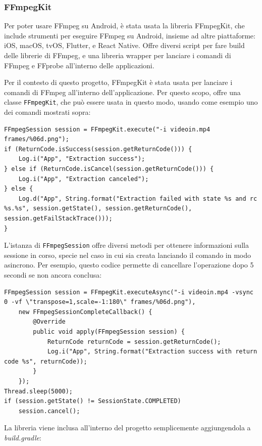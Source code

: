 \subsubsection*{FFmpegKit}

Per poter usare FFmpeg su Android, è stata usata la libreria FFmpegKit\cite{git_ffmpegkit}, che include strumenti
per eseguire FFmpeg su Android, insieme ad altre piattaforme: iOS, macOS, tvOS, Flutter, e 
React Native. Offre diversi script per fare build delle librerie di FFmpeg, e una libreria 
wrapper per lanciare i comandi di FFmpeg e FFprobe all'interno delle applicazioni. 

Per il contesto di questo progetto, FFmpegKit è stata usata per lanciare i comandi di FFmpeg
all'interno dell'applicazione. Per questo scopo, offre una classe \texttt{FFmpegKit}, che può
essere usata in questo modo, usando come esempio uno dei comandi mostrati sopra:

\begin{lstlisting}
FFmpegSession session = FFmpegKit.execute("-i videoin.mp4 frames/%06d.png");
if (ReturnCode.isSuccess(session.getReturnCode())) {
    Log.i("App", "Extraction success");
} else if (ReturnCode.isCancel(session.getReturnCode())) {
    Log.i("App", "Extraction canceled");
} else {
    Log.d("App", String.format("Extraction failed with state %s and rc %s.%s", session.getState(), session.getReturnCode(), session.getFailStackTrace()));
}
\end{lstlisting}

L'istanza di \texttt{FFmpegSession} offre diversi metodi per ottenere informazioni sulla sessione
in corso, specie nel caso in cui sia creata lanciando il comando in modo asincrono. Per esempio,
questo codice permette di cancellare l'operazione dopo 5 secondi se non ancora conclusa:

\begin{lstlisting}
FFmpegSession session = FFmpegKit.executeAsync("-i videoin.mp4 -vsync 0 -vf \"transpose=1,scale=-1:180\" frames/%06d.png"),
    new FFmpegSessionCompleteCallback() {
        @Override
        public void apply(FFmpegSession session) {
            ReturnCode returnCode = session.getReturnCode();
            Log.i("App", String.format("Extraction success with return code %s", returnCode));
        }
    });
Thread.sleep(5000);
if (session.getState() != SessionState.COMPLETED)
    session.cancel();
\end{lstlisting}

La libreria viene inclusa all'interno del progetto semplicemente aggiungendola a 
\emph{build.gradle}:


